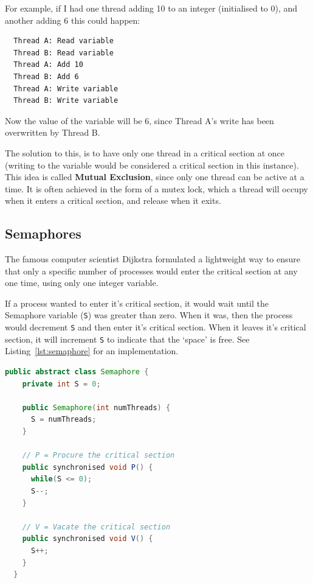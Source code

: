 For example, if I had one thread adding 10 to an integer (initialised to 0), and
another adding 6 this could happen:

\begin{lstlisting}
  Thread A: Read variable 
  Thread B: Read variable 
  Thread A: Add 10        
  Thread B: Add 6         
  Thread A: Write variable
  Thread B: Write variable
\end{lstlisting}

Now the value of the variable will be 6, since Thread A's write has been
overwritten by Thread B.

The solution to this, is to have only one thread in a critical section at once
(writing to the variable would be considered a critical section in this
instance). This idea is called \textbf{Mutual Exclusion}, since only one thread
can be active at a time. It is often achieved in the form of a mutex lock, which
a thread will occupy when it enters a critical section, and release when it
exits.

\subsection{Semaphores}

The famous computer scientist Dijkstra formulated a lightweight way to ensure
that only a specific number of processes would enter the critical section at any
one time, using only one integer variable.

If a process wanted to enter it's critical section, it would wait until the
Semaphore variable (\texttt{S}) was greater than zero. When it was, then the
process would decrement \texttt{S} and then enter it's critical section. When it
leaves it's critical section, it will increment \texttt{S} to indicate that the
`space' is free. See Listing~\ref{lst:semaphore} for an implementation.


\begin{lstlisting}[language=Java, label=lst:semaphore, caption={A Java
                   implementation of a Semaphore}]
  public abstract class Semaphore {
    private int S = 0;

    public Semaphore(int numThreads) {
      S = numThreads;
    }

    // P = Procure the critical section
    public synchronised void P() {
      while(S <= 0);
      S--;
    }

    // V = Vacate the critical section
    public synchronised void V() {
      S++;
    }
  }
\end{lstlisting}

